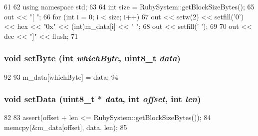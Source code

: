 \begin{DoxyCode}
61 {
62     using namespace std;
63 
64     int size = RubySystem::getBlockSizeBytes();
65     out << "[ ";
66     for (int i = 0; i < size; i++) {
67         out << setw(2) << setfill('0') << hex << "0x" << (int)m_data[i] << " ";
68         out << setfill(' ');
69     }
70     out << dec << "]" << flush;
71 }
\end{DoxyCode}
\hypertarget{classDataBlock_aebd25abdba7e6d75c7001647acbd204c}{
\subsubsection[{setByte}]{\setlength{\rightskip}{0pt plus 5cm}void setByte (int {\em whichByte}, \/  uint8\_\-t {\em data})}}
\label{classDataBlock_aebd25abdba7e6d75c7001647acbd204c}



\begin{DoxyCode}
92 {
93     m_data[whichByte] = data;
94 }
\end{DoxyCode}
\hypertarget{classDataBlock_a2d3a78eb60f9589815df5d9d82a0faad}{
\subsubsection[{setData}]{\setlength{\rightskip}{0pt plus 5cm}void setData (uint8\_\-t $\ast$ {\em data}, \/  int {\em offset}, \/  int {\em len})}}
\label{classDataBlock_a2d3a78eb60f9589815df5d9d82a0faad}



\begin{DoxyCode}
82 {
83     assert(offset + len <= RubySystem::getBlockSizeBytes());
84     memcpy(&m_data[offset], data, len);
85 }
\end{DoxyCode}


